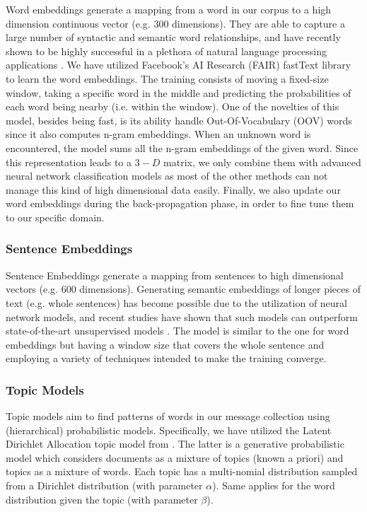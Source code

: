 \documentclass[letterpaper]{article}
\begin{document}
Word embeddings generate a mapping from a word in our corpus to a high dimension continuous vector (e.g. $300$ dimensions). They are able to capture a large number of syntactic and semantic word relationships, and have recently shown to be highly successful in a plethora of natural language processing applications \cite{mikolov2013distributed} \cite{bojanowski2016enriching}. We have utilized Facebook's AI Research (FAIR) fastText library \cite{bojanowski2016enriching} to learn the word embeddings. The training consists of moving a fixed-size window, taking a specific word in the middle and predicting the probabilities of each word being nearby (i.e. within the window). One of the novelties of this model, besides being fast, is its ability handle Out-Of-Vocabulary (OOV) words since it also computes n-gram embeddings. When an unknown word is encountered, the model sums all the n-gram embeddings of the given word. Since this representation leads to a $3-D$ matrix, we only combine them with advanced neural network classification models as most of the other methods can not manage this kind of high dimensional data easily. Finally, we also update our word embeddings during the back-propagation phase, in order to fine tune them to our specific domain.

\subsubsection{Sentence Embeddings}  \label{Sentence Embeddings}

Sentence Embeddings generate a mapping from sentences to high dimensional vectors (e.g. $600$ dimensions). Generating semantic embeddings of longer pieces of text (e.g. whole sentences) has become possible due to the utilization of neural network models, and recent studies have shown that such models can outperform state-of-the-art unsupervised models \cite{pagliardini2017unsupervised}. The model is similar to the one for word embeddings but having a window size that covers the whole sentence and employing a variety of techniques intended to make the training converge.

\subsubsection{Topic Models}  \label{Topics}

Topic models aim to find patterns of words in our message collection using (hierarchical) probabilistic models. Specifically, we have utilized the Latent Dirichlet Allocation topic model from \cite{blei2006dynamic}. The latter is a generative probabilistic model which considers documents as a mixture of topics (known a priori) and topics as a mixture of words. Each topic has a multi-nomial distribution sampled from a Dirichlet distribution (with parameter $\alpha$). Same applies for the word distribution given the topic (with parameter $\beta$).
\end{document}
